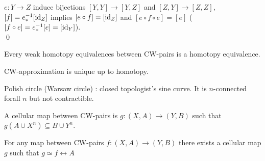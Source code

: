     \begin{prf}
        $e : Y \to Z$ induce bijections $ [Y,Y] \to [Y,Z]$ and $[Z,Y] \to [Z,Z]$,
        $[f] = e_{\ast}^{-1} [\mathrm{id}_Z]$ implies $[e \circ f] = [\mathrm{id}_Z]$ and $[e \circ f \circ e] = [e]$ ($[f \circ e] = e_{\ast}^{-1}[e] = [\mathrm{id}_Y]$).\\
        \qed
    \end{prf}

    \begin{thm}
        Every weak homotopy equivalences between CW-pairs is a homotopy equivalence.
    \end{thm}

    \begin{cor}
        CW-approximation is unique up to homotopy.
    \end{cor}

    \begin{exmp}
        Polish circle (Warsaw circle) : closed topologist's sine curve.
        It is $n$-connected forall $n$ but not contractible.
    \end{exmp}

    \begin{defn}
        A cellular map between CW-pairs is $g:(X,A) \to (Y,B)$ such that
        $g(A\cup X^n) \subseteq B \cup Y^n$.
    \end{defn}

    \begin{thm}
        For any map between CW-pairs $f : (X,A) \to (Y,B)$ there exists
        a cellular map $g$ such that $g \simeq f \rel A$
    \end{thm}

